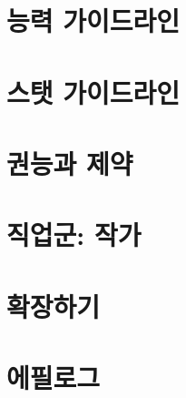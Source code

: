 \documentclass{report}
\begin{document}
	\hypertarget{ability-guidelines}{}
	\chapter{능력 가이드라인}
		
	
	\chapter{스탯 가이드라인}
		
	
	\chapter{권능과 제약}
		
	
	\chapter{직업군: 작가}
		
	
	\chapter{확장하기}
		
	
	\chapter{에필로그}
		
\end{document}
